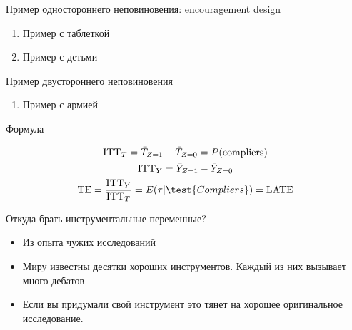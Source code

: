 \begin{frame}{Пример одностороннего неповиновения: encouragement design}

\begin{enumerate}
    \item Пример с таблеткой
    \item Пример с детьми
\end{enumerate}

\end{frame}

\begin{frame}{Пример двустороннего неповиновения}

\begin{enumerate}
    \item Пример с армией
\end{enumerate}

\end{frame}

\begin{frame}{Формула}

\begin{gather}
    \text{ITT}_T = \bar T_{Z=1} - \bar T_{Z=0} = P(\text{compliers}) \\
    \text{ITT}_Y = \bar Y_{Z=1} - \bar Y_{Z=0} \\ %
    \text{TE} = \frac{\text{ITT}_Y}{\text{ITT}_T} = E(\tau|\test{Compliers}) = \text{LATE}
\end{gather}
\end{frame}

\begin{frame}{Откуда брать инструментальные переменные?}
\begin{itemize}
    \item Из опыта чужих исследований
    \item Миру известны десятки хороших инструментов. Каждый из них вызывает много дебатов
    \item Если вы придумали свой инструмент это тянет на хорошее оригинальное исследование.
\end{itemize}

\end{frame}





    

